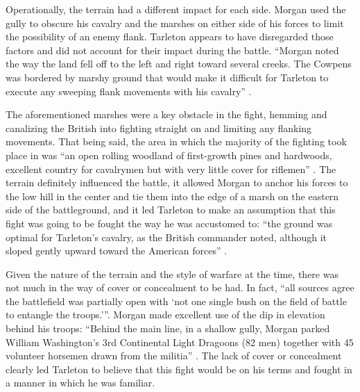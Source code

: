 Operationally, the terrain had a different impact for each side.  Morgan used
the gully to obscure his cavalry and the marshes on either side of his forces to
limit the possibility of an enemy flank.  Tarleton appears to have disregarded
those factors and did not account for their impact during the battle.  “Morgan
noted the way the land fell off to the left and right toward several creeks.
The Cowpens was bordered by marshy ground that would make it difficult for
Tarleton to execute any sweeping flank movements with his cavalry” \cite[45]{fleming_cowpens_1988}.

The aforementioned marshes were a key obstacle in the fight, hemming and
canalizing the British into fighting straight on and limiting any flanking
movements.  That being said, the area in which the majority of the fighting took
place in was ``an open rolling woodland of first-growth pines and hardwoods,
excellent country for cavalrymen but with very little cover for riflemen''
\cite[124]{lumpkin_savannah_1981}.  The terrain definitely influenced the battle, it allowed
Morgan to anchor his forces to the low hill in the center and tie them into the
edge of a marsh on the eastern side of the battleground, and it led Tarleton to
make an assumption that this fight was going to be fought the way he was
accustomed to: ``the ground was optimal for Tarleton's cavalry, as the British
commander noted, although it sloped gently upward toward the American forces''
\cite[46]{moncure_cowpens_1996}.

Given the nature of the terrain and the style of warfare at the time, there was
not much in the way of cover or concealment to be had.  In fact, ``all sources
agree the battlefield was partially open with `not one single bush on the field
of battle to entangle the troops.'''\cite[66]{babits_devil_2001}.  Morgan made
excellent use of the dip in elevation behind his troops: ``Behind the main line,
in a shallow gully, Morgan parked William Washington's 3rd Continental Light
Dragoons (82 men) together with 45 volunteer horsemen drawn from the militia''
\cite[327]{stephenson_patriot_2007}.  The lack of cover or concealment clearly
led Tarleton to believe that this fight would be on his terms and fought in a
manner in which he was familiar.  


